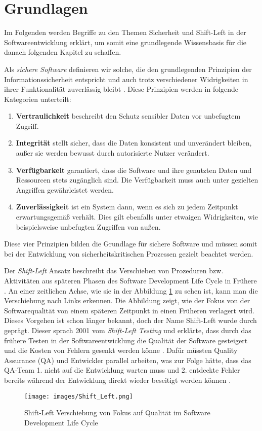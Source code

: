 \section{Grundlagen}

Im Folgenden werden Begriffe zu den Themen Sicherheit und Shift-Left in der Softwareentwicklung erklärt, um somit eine grundlegende Wissensbasis für die danach folgenden Kapitel zu schaffen.

Als \textit{sichere Software} definieren wir solche, die den grundlegenden Prinzipien der Informationssicherheit \cite{blakley_information_2001} entspricht und auch trotz verschiedener Widrigkeiten in ihrer Funktionalität zuverlässig bleibt \cite{oueslati_literature_2015}. Diese Prinzipien werden in folgende Kategorien unterteilt:
\begin{enumerate}
    \item \textbf{Vertraulichkeit} beschreibt den Schutz sensibler Daten vor unbefugtem Zugriff.
    \item \textbf{Integrität} stellt sicher, dass die Daten konsistent und unverändert bleiben, außer sie werden bewusst durch autorisierte Nutzer verändert.
    \item \textbf{Verfügbarkeit} garantiert, dass die Software und ihre genutzten Daten und Ressourcen stets zugänglich sind. Die Verfügbarkeit muss auch unter gezielten Angriffen gewährleistet werden.
    \item \textbf{Zuverlässigkeit} ist ein System dann, wenn es sich zu jedem Zeitpunkt erwartungsgemäß verhält. Dies gilt ebenfalls unter etwaigen Widrigkeiten, wie beispielsweise unbefugten Zugriffen von außen.
\end{enumerate}
Diese vier Prinzipien bilden die Grundlage für sichere Software und müssen somit bei der Entwicklung von sicherheitskritischen Prozessen gezielt beachtet werden.\

Der \textit{Shift-Left} Ansatz beschreibt das Verschieben von Prozeduren bzw. Aktivitäten aus späteren Phasen des Software Development Life Cycle in Frühere \cite{andriadi_impact_2023}. An einer zeitlichen Achse, wie sie in der Abbildung \ref{fig:shiftleft} zu sehen ist, kann man die Verschiebung nach Links erkennen. Die Abbildung zeigt, wie der Fokus von der Softwarequalität von einem späteren Zeitpunkt in einen Früheren verlagert wird. Dieses Vorgehen ist schon länger bekannt, doch der Name Shift-Left wurde durch \citet{smith_shift-left_2001} geprägt. Dieser sprach 2001 vom \textit{Shift-Left Testing} und erklärte, dass durch das frühere Testen in der Softwareentwicklung die Qualität der Software gesteigert und die Kosten von Fehlern gesenkt werden könne \cite{dawoud_better_2024}. Dafür müssten Quality Assurance (QA) und Entwickler parallel arbeiten, was zur Folge hätte, dass das QA-Team 1. nicht auf die Entwicklung warten muss und 2. entdeckte Fehler bereits während der Entwicklung direkt wieder beseitigt werden können \cite{andriadi_impact_2023}. 

\begin{figure}
    \centering
    \texttt{[image: images/Shift\_Left.png]}
    \caption{Shift-Left Verschiebung von Fokus auf Qualität im Software Development Life Cycle}
    \label{fig:shiftleft}
  \end{figure}

